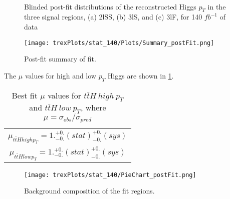 \begin{figure}[H]
    \\
    \caption{Blinded post-fit distributions of the reconstructed Higgs $p_T$ in the three signal regions, (a) 2lSS, (b) 3lS, and (c) 3lF, for 140 $fb^{-1}$ of data}
    \label{fig:sigRegions140}
\end{figure}

\begin{figure}[H]
    \center
    \texttt{[image: trexPlots/stat\_140/Plots/Summary\_postFit.png]}
    \caption{Post-fit summary of fit.}
    \label{fig:Summary140}
\end{figure}

The $\mu$ values for high and low $p_T$ Higgs are shown in \ref{tab:mu140}.

\begin{table}[H]
  \centering
  \begin{tabular}{c}
     $\mu_{t\bar{t}H high p_T} = 1.^{+0.}_{-0.}(stat)^{+0.}_{-0.}(sys)$ \\
     $\mu_{t\bar{t}H low p_T} = 1.^{+0.}_{-0.}(stat)^{+0.}_{-0.}(sys)$ \\
  \end{tabular}
  \caption{Best fit $\mu$ values for $t\bar{t}H\ high\ p_T$ and  $t\bar{t}H\ low\ p_T$, where $\mu = \sigma_{obs}/\sigma_{pred}$} 
  \label{tab:mu140}
\end{table}

\begin{figure}[H]
    \centering                                                                                                               
    \texttt{[image: trexPlots/stat\_140/PieChart\_postFit.png]}
    \caption{Background composition of the fit regions.}
    \label{fig:pieChart140}
\end{figure}

